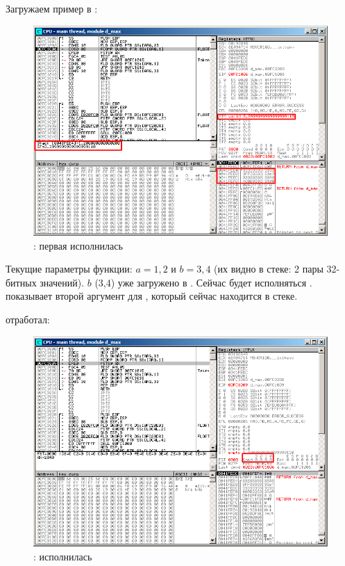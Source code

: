 ﻿\clearpage
{}
\myindex{\olly}

Загружаем пример в \olly:

\begin{figure}[H]
\centering
\includegraphics[scale=\FigScale]{patterns/12_FPU/3_comparison/x86/MSVC/olly1_1.png}
\caption{\olly: первая \FLD исполнилась}
\label{fig:FPU_comparison_case1_olly1}
\end{figure}

Текущие параметры функции: $a=1,2$ и $b=3,4$ 
(их видно в стеке: 2 пары 32-битных значений).
$b$ (3,4) уже загружено в .
Сейчас будет исполняться \FCOMP. 
\olly показывает второй аргумент для \FCOMP, который сейчас находится в стеке.

\clearpage
\FCOMP отработал:

\begin{figure}[H]
\centering
\includegraphics[scale=\FigScale]{patterns/12_FPU/3_comparison/x86/MSVC/olly1_2.png}
\caption{\olly: \FCOMP исполнилась}
\label{fig:FPU_comparison_case1_olly2}
\end{figure}

